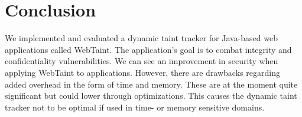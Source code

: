 \chapter{Conclusion}
\label{Conclusion}
We implemented and evaluated a dynamic taint tracker for Java-based web applications called WebTaint. The application's goal is to combat integrity and confidentiality vulnerabilities. We can see an improvement in security when applying WebTaint to applications. However, there are drawbacks regarding added overhead in the form of time and memory. These are at the moment quite significant but could lower through optimizations. This causes the dynamic taint tracker not to be optimal if used in time- or memory sensitive domains.